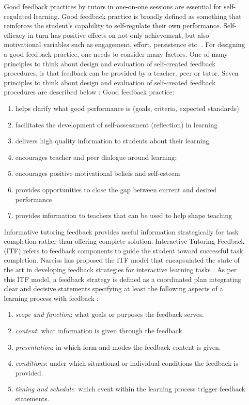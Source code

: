 Good feedback practices by tutors in one-on-one sessions are essential for self-regulated learning. Good feedback practice is broadly defined as something that reinforces the student's capability to self-regulate their own performance. Self-efficacy in turn has positive effects on not only achievement, but also motivational variables such as engagement, effort, persistence etc. \parencite{narciss2004impact}. For designing a good feedback practice, one needs to consider many factors. One of many principles to think about design and evaluation of self-created feedback procedures, is that feedback can be provided by a teacher, peer or tutor. Seven principles to think about design and evaluation of self-created feedback procedures are described below \parencite{nicol2006formative}: 
Good feedback practice: 
\begin{enumerate}
    \item helps clarify what good performance is (goals, criteria, expected standards)
    \item facilitates the development of self-assessment (reflection) in learning
    \item delivers high quality information to students about their learning
    \item encourages teacher and peer dialogue around learning;
    \item  encourages positive motivational beliefs and self-esteem
    \item provides opportunities to close the gap between current and desired performance
    \item  provides information to teachers that can be used to help shape teaching
\end{enumerate}
Informative tutoring feedback provides useful information strategically for task completion rather than offering complete solution. Interactive-Tutoring-Feedback (ITF) refers to feedback components to guide the student toward successful task completion. Narciss has proposed the ITF model that encapsulated the state of the art in developing feedback strategies for interactive learning tasks \parencite{narciss2005informatives} \parencite{narciss2008feedback} \parencite{narciss2013designing}. As per this ITF model, a feedback strategy is defined as a coordinated plan integrating clear and decisive statements specifying at least the following aspects of a learning process with feedback \parencite{narciss2012feedback}:
\begin{enumerate}
    \item \textit{scope and function}: what goals or purposes the feedback serves.
    \item \textit{content}: what information is given through the feedback.
    \item \textit{presentation}: in which form and modes the feedback content is given.
    \item \textit{conditions}: under which situational or individual conditions the feedback is provided.
    \item \textit{timing and schedule}: which event within the learning process trigger feedback statements. 
\end{enumerate}
